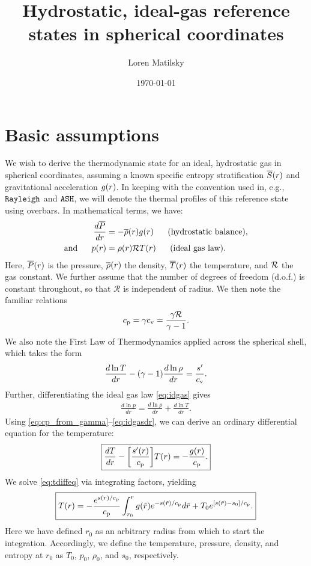 \documentclass[12pt]{article} %
\date{\today}
\author{Loren Matilsky}
\title{Hydrostatic, ideal-gas reference states in spherical coordinates}
\begin{document}
	\maketitle
	\section{Basic assumptions}
	We wish to derive the thermodynamic state for an ideal, hydrostatic gas in spherical coordinates, assuming a known specific entropy stratification $\overline{S}(r)$ and gravitational acceleration $g(r)$. In keeping with the convention used in, e.g., $\texttt{Rayleigh}$ and $\texttt{ASH}$, we will denote the thermal profiles of this reference state using overbars. In mathematical terms, we have:
	\begin{align}
	\frac{d\overline{P}}{dr} &= -\overline{\rho}(r) g(r)\ \ \ \ \ \text{(hydrostatic balance)}\label{eq:hydr},\\
	\text{and}\ \ \ \ \  p(r) &= \rho(r)\mathcal{R} T(r)\ \ \ \ \ \text{(ideal gas law)}.\label{eq:idgas}
	\end{align}
	Here, $\overline{P}(r)$ is the pressure, $\overline{\rho}(r)$ the density, $\overline{T}(r)$ the temperature, and $\mathcal{R}$ the gas constant. We further assume that the number of degrees of freedom (d.o.f.) is constant throughout, so that $\mathcal{R}$ is independent of radius. We then note the familiar relations
	\begin{align}
	c_{\rm{p}} = \gamma c_{\rm{v}} = \frac{\gamma\mathcal{R}}{\gamma - 1}\label{eq:cp_from_gamma}.
	\end{align}
	We also note the First Law of Thermodynamics applied across the spherical shell, which takes the form
	\begin{align}
	\frac{d\ln{T}}{dr} - (\gamma - 1)\frac{d\ln{\rho}}{dr} = \frac{s^\prime}{c_{\rm{v}}}.
	\label{eq:firstlaw}
	\end{align}
	Further, differentiating the ideal gas law \eqref{eq:idgas} gives
	\begin{align}
	\frac{d\ln{p}}{dr} = \frac{d\ln{\rho}}{dr} + \frac{d\ln{T}}{dr}. 
	\label{eq:idgasdr}
	\end{align}
	Using \eqref{eq:cp_from_gamma}--\eqref{eq:idgasdr}, we can derive an ordinary differential equation for the temperature:
	\begin{align}
	\boxed{
	\frac{dT}{dr} - \bigg{[}\frac{s^\prime(r)}{c_{\rm{p}}}\bigg{]}T(r) = -\frac{g(r)}{c_{\rm{p}}}.
}
\label{eq:tdiffeq}
	\end{align}
	We solve \eqref{eq:tdiffeq} via integrating factors, yielding 
	\begin{align}
	\boxed{
	T(r) = -\frac{e^{s(r)/c_{\rm{p}}}}{c_{\rm{p}}}\int_{r_0}^r g(\tilde{r})e^{-s(\tilde{r})/c_{\rm{p}}}d\tilde{r} + T_0e^{[s(\tilde{r})-s_0]/c_{\rm{p}}}.
	\label{eq:tgeneral}}
	\end{align}
	Here we have defined $r_0$ as an arbitrary radius from which to start the integration. Accordingly, we define the temperature, pressure, density, and entropy at $r_0$ as $T_0$, $p_0$, $\rho_0$, and $s_0$, respectively.
	
\end{document}
